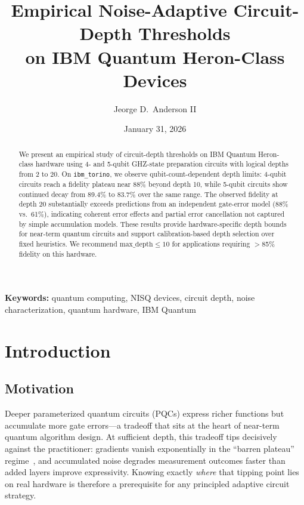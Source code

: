 \documentclass[12pt,letterpaper]{article}
\title{\textbf{Empirical Noise-Adaptive Circuit-Depth Thresholds\\
on IBM Quantum Heron-Class Devices}}
\author[1]{Jeorge D.\ Anderson II}
\affil[1]{Independent Researcher}
\date{January 31, 2026}
\begin{document}
\maketitle

\begin{abstract}
We present an empirical study of circuit-depth thresholds on IBM Quantum
Heron-class hardware using 4- and 5-qubit GHZ-state preparation circuits with
logical depths from 2 to 20. On \texttt{ibm\_torino}, we observe
qubit-count-dependent depth limits: 4-qubit circuits reach a fidelity plateau near
88\% beyond depth 10, while 5-qubit circuits show continued decay from 89.4\% to
83.7\% over the same range. The observed fidelity at depth 20 substantially
exceeds predictions from an independent gate-error model (88\% vs.\ 61\%),
indicating coherent error effects and partial error cancellation not captured by
simple accumulation models. These results provide hardware-specific depth bounds
for near-term quantum circuits and support calibration-based depth selection over
fixed heuristics. We recommend $\text{max\_depth} \leq 10$ for applications
requiring $>$85\% fidelity on this hardware.
\end{abstract}

\noindent\textbf{Keywords:} quantum computing, NISQ devices, circuit depth, noise
characterization, quantum hardware, IBM Quantum

\section{Introduction}

\subsection{Motivation}

Deeper parameterized quantum circuits (PQCs) express richer functions but accumulate
more gate errors---a tradeoff that sits at the heart of near-term quantum algorithm
design. At sufficient depth, this tradeoff tips decisively against the practitioner:
gradients vanish exponentially in the ``barren plateau''
regime~\cite{mcclean2018barren,cerezo2021cost}, and accumulated noise degrades
measurement outcomes faster than added layers improve expressivity. Knowing exactly
\emph{where} that tipping point lies on real hardware is therefore a prerequisite for
any principled adaptive circuit strategy.
\end{document}
